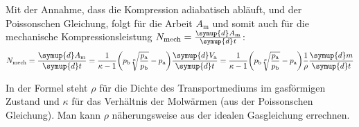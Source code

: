 Mit der Annahme, dass die Kompression adiabatisch abläuft, und der Poissonschen Gleichung, folgt für die Arbeit $A_{\text{m}}$ und somit auch für die mechanische Kompressionsleistung $N_{\text{mech}} = \frac{\symup{d}A_{\text{m}}}{\symup{d}t}$:
\begin{equation} \label{eqn:kompressorleistung}
    N_{\text{mech}} = \frac{\symup{d}A_{\text{m}}}{\symup{d}t} 
    = \frac{1}{\kappa - 1} \biggl( p_{\text{b}} \sqrt[\kappa]{\frac{p_{\text{a}}}{p_{\text{b}}}} - p_{\text{a}} \biggr) \frac{\symup{d}V_{\text{a}}}{\symup{d}t}
    = \frac{1}{\kappa -1} \biggl( p_{\text{b}} \sqrt[\kappa]{\frac{p_{\text{a}}}{p_{\text{b}}}} - p_{\text{a}} \biggr) \frac{1}{\rho} \frac{\symup{d}m}{\symup{d}t}
\end{equation}

In der Formel steht $\rho$ für die Dichte des Transportmediums im gasförmigen Zustand und $\kappa$ für das Verhältnis der Molwärmen (aus der Poissonschen Gleichung).
Man kann $\rho$ näherungsweise aus der idealen Gasgleichung errechnen.